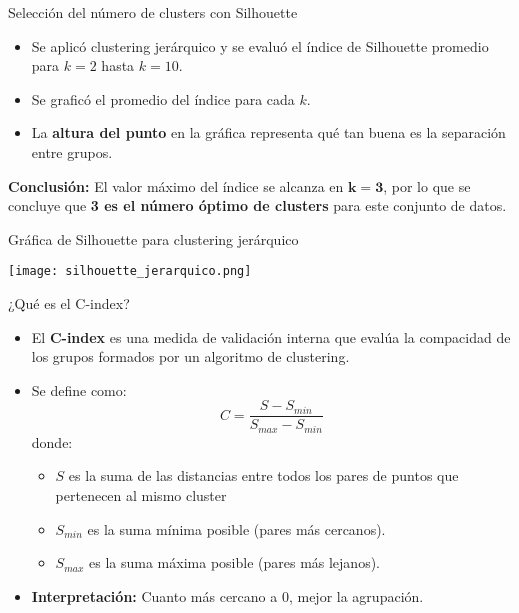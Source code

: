\documentclass[
	11pt, %
]{beamer}
\begin{document}
\begin{frame}{Selección del número de clusters con Silhouette}

\begin{itemize}
    \item Se aplicó clustering jerárquico y se evaluó el índice de Silhouette promedio para \(k = 2\) hasta \(k = 10\).
    \item Se graficó el promedio del índice para cada \(k\).
    \item La \textbf{altura del punto} en la gráfica representa qué tan buena es la separación entre grupos.
\end{itemize}

\vspace{0.3cm}

\vspace{0.3cm}
\textbf{Conclusión:} El valor máximo del índice se alcanza en \(\mathbf{k = 3}\), por lo que se concluye que \textbf{3 es el número óptimo de clusters} para este conjunto de datos.

\end{frame}

\begin{frame}{Gráfica de Silhouette para clustering jerárquico}
\begin{center}
    \texttt{[image: silhouette\_jerarquico.png]}
\end{center}

\end{frame}


\begin{frame}{¿Qué es el C-index?}
    \begin{itemize}
        \item El \textbf{C-index} es una medida de validación interna que evalúa la compacidad de los grupos formados por un algoritmo de clustering.
        \item Se define como:
        \[
            C = \frac{S - S_{min}}{S_{max} - S_{min}}
        \]
        donde:
        \begin{itemize}
            \item $S$ es la suma de las distancias entre todos los pares de puntos que pertenecen al mismo cluster
            \item $S_{min}$ es la suma mínima posible (pares más cercanos).
            \item $S_{max}$ es la suma máxima posible (pares más lejanos).
        \end{itemize}
        \item \textbf{Interpretación:} Cuanto más cercano a 0, mejor la agrupación.
    \end{itemize}
\end{frame}
\end{document}
